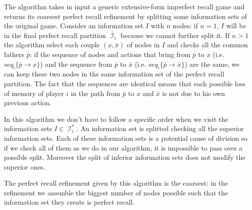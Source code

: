 \documentclass{article}
\DeclareMathOperator*{\I}{\mathcal{I}}
\begin{document}
\noindent
The algorithm takes in input a generic extensive-form imperfect recall game and returns its coarsest perfect recall refinement by splitting some information sets of the original game.
Consider an information set $I$ with $n$ nodes: if $n=1$, $I$ will be in the final perfect recall partition $\bar{\I}_i$ because we cannot further split it. If $n>1$ the algorithm select each couple $(x,\bar{x})$ of nodes in $I$ and checks all the common fathers $\bar{p}$: if the sequence of nodes and actions that bring from $\bar{p}$ to $x$ (i.e. $seq_i\{\bar{p}\rightarrow x\}$) and the sequence from $\bar{p}$ to $\bar{x}$ (i.e. $seq_i\{\bar{p}\rightarrow \bar{x}\}$) are the same, we can keep these two nodes in the same information set of the perfect recall partition. The fact that the sequences are identical means that each possible loss of memory of player $i$ in the path from $\bar{p}$ to $x$ and $\bar{x}$ is not due to his own previous action. \\
\noindent

In this algorithm we don't have to follow a specific order when we visit the information sets $I\in \I_i^\ast$.
An information set is splitted checking all the superior information sets. Each of these information sets is a potential cause of division so if we check all of them as we do in our algorithm, it is impossible to pass over a possible split. Moreover the split of inferior information sets does not modify the superior ones.

The perfect recall refinement given by this algorithm is the coarsest: in the refinement we assemble the biggest number of nodes possible such that the information set they create is perfect recall. 





\end{document}
